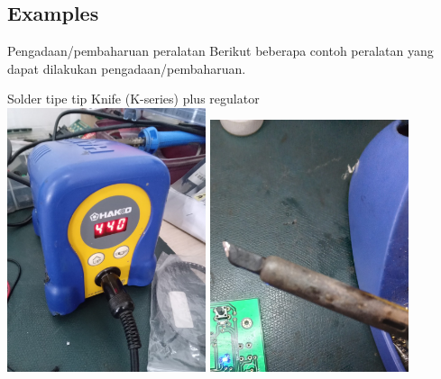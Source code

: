 \documentclass[table,dvipsnames]{beamer}
\begin{document}
	\subsection{Examples}
	\begin{frame}
		\begin{exampleblock}{Pengadaan/pembaharuan peralatan}
			Berikut beberapa contoh peralatan yang dapat dilakukan pengadaan/pembaharuan.
		\end{exampleblock}
	
		\begin{exampleblock}{Solder tipe tip Knife (K-series) plus regulator}
			\centering
			\includegraphics[width=165pt,angle=-90,origin=c]{images/solder0}
			\includegraphics[width=165pt,angle=-90,origin=c]{images/solder1}
		\end{exampleblock}
	\end{frame}
\end{document}
